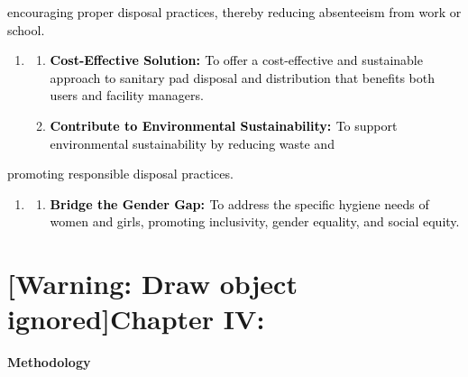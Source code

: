 \documentclass[letterpaper]{article}
\newcounter{saveenum}
\newcommand\liststyleWWNumiv{%
\renewcommand\theenumi{\arabic{enumi}}
\renewcommand\theenumii{\arabic{enumii}}
\renewcommand\labelenumi{\theenumi.}
\renewcommand\labelenumii{\theenumii.}
\renewcommand\labelitemi{{\textbullet}}
\renewcommand\labelitemii{{\textbullet}}
}
\begin{document}
\bigskip

\textcolor{black}{encouraging proper disposal practices, thereby reducing absenteeism from work or school.}


\bigskip

\liststyleWWNumiv
\setcounter{saveenum}{\value{enumi}}
\begin{enumerate}
\setcounter{enumi}{\value{saveenum}}
\item \setcounter{saveenum}{\value{enumii}}
\begin{enumerate}
\setcounter{enumii}{\value{saveenum}}
\item \textbf{\textcolor{black}{Cost-Effective Solution: }}\textcolor{black}{To offer a cost-effective and sustainable
approach to sanitary pad disposal and distribution that benefits both users and facility managers.}
\item \textbf{\textcolor{black}{Contribute to Environmental Sustainability: }}\textcolor{black}{To support environmental
sustainability by reducing waste and}
\end{enumerate}
\end{enumerate}
\textcolor{black}{promoting responsible disposal practices.}

\liststyleWWNumiv
\setcounter{saveenum}{\value{enumi}}
\begin{enumerate}
\setcounter{enumi}{\value{saveenum}}
\item \setcounter{saveenum}{\value{enumii}}
\begin{enumerate}
\setcounter{enumii}{\value{saveenum}}
\item \textbf{\textcolor{black}{Bridge the Gender Gap: }}\textcolor{black}{To address the specific hygiene needs of
women and girls, promoting inclusivity, gender equality, and social equity.}
\end{enumerate}
\end{enumerate}
\clearpage\setcounter{page}{1}\pagestyle{Convertedxii}
\section[Chapter IV:]{[Warning: Draw object ignored]Chapter IV:}
\textbf{Methodology}


\bigskip


\bigskip


\bigskip


\bigskip


\bigskip


\bigskip


\bigskip
\end{document}

